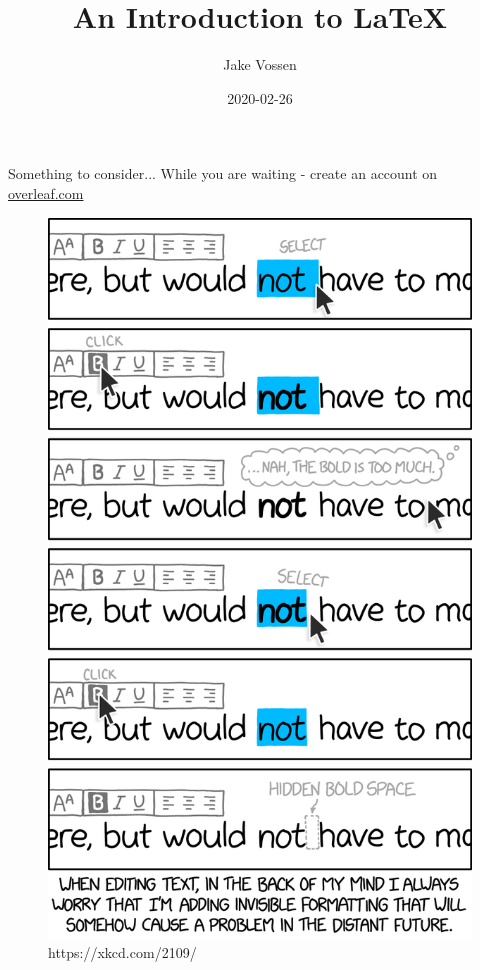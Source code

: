 \documentclass{beamer}
\title{An Introduction to \LaTeX}
\author{Jake Vossen}
\institute{Colorado School of Mines - ACM-W}
\date{2020-02-26}
\begin{document}
\begin{frame}{Something to consider...}
    While you are waiting - create an account on \url{overleaf.com}
    \begin{figure}
    \includegraphics[scale=.13]{invisible_formatting_2x.png}
    \caption{https://xkcd.com/2109/}
  \end{figure}
\end{frame}
\begin{frame}
  \titlepage
\end{frame}

\end{document}
